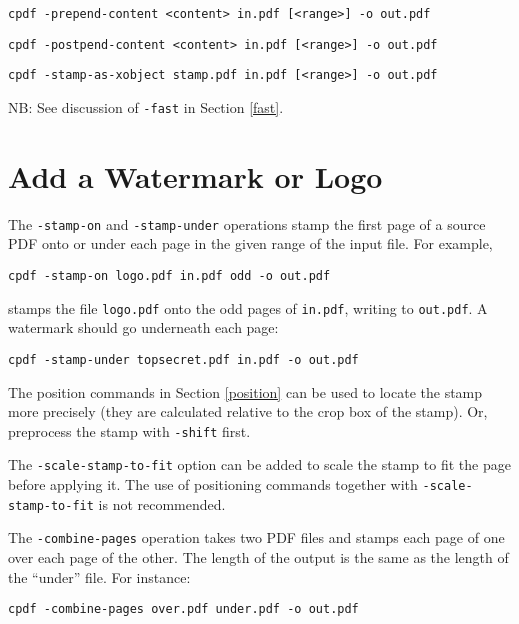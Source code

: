 \documentclass{book}
\begin{document}
\begin{framed}
  \vspace{1.5mm}
  \noindent\small\verb!cpdf -prepend-content <content> in.pdf [<range>] -o out.pdf!

  \vspace{1.5mm}
  \noindent\small\verb!cpdf -postpend-content <content> in.pdf [<range>] -o out.pdf!

  \vspace{1.5mm}
  \noindent\small\verb!cpdf -stamp-as-xobject stamp.pdf in.pdf [<range>] -o out.pdf!

  \vspace{1.5mm}
  \noindent\small NB: See discussion of \texttt{-fast} in Section \ref{fast}.
  \end{framed}

  \section{Add a Watermark or Logo}
  The \texttt{-stamp-on} and \texttt{-stamp-under} operations stamp the first
page of a source PDF onto or under each page in the given range of the input
file. For example,
  \begin{framed}
    \small\verb!cpdf -stamp-on logo.pdf in.pdf odd -o out.pdf!
  \end{framed}
\noindent stamps the file \texttt{logo.pdf} onto the odd pages of \texttt{in.pdf},
writing to \texttt{out.pdf}. A watermark should go underneath each page:
  \begin{framed}
    \small\verb!cpdf -stamp-under topsecret.pdf in.pdf -o out.pdf!
  \end{framed}

\noindent The position commands in Section \ref{position} can be used to locate the stamp more precisely (they are calculated relative to the crop box of the stamp). Or, preprocess the stamp with \texttt{-shift} first.

The \texttt{-scale-stamp-to-fit} option can be added to scale the stamp to fit the page before applying it. The use of positioning commands together with \texttt{-scale-stamp-to-fit} is not recommended.

  The \texttt{-combine-pages} operation takes two PDF files and stamps each
page of one over each page of the other. The length of the output is the same
as the length of the ``under'' file. For instance:
  \begin{framed}
    \small\verb!cpdf -combine-pages over.pdf under.pdf -o out.pdf!
  \end{framed}
\end{document}
